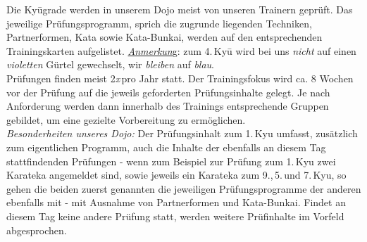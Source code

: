 \begin{center}
{\begin{center}
		\end{center}
		Die Ky\={u}grade werden in unserem Dojo meist von unseren Trainern geprüft. Das jeweilige Prüfungsprogramm, sprich die zugrunde liegenden Techniken, Partnerformen, Kata sowie Kata-Bunkai, werden auf den entsprechenden Trainingskarten aufgelistet. \textit{\underline{Anmerkun}}g: zum 4.\,Ky\={u} wird bei uns \textit{nicht} auf einen \textit{violetten} Gürtel gewechselt, wir \textit{bleiben} auf \textit{blau}.\\

		Prüfungen finden meist 2\textit{x}\,pro Jahr statt. Der Trainingsfokus wird ca. 8 Wochen vor der Prüfung auf die jeweils geforderten Prüfungsinhalte gelegt. Je nach Anforderung werden dann innerhalb des Trainings entsprechende Gruppen gebildet, um eine gezielte Vorbereitung zu ermöglichen.\\

		\textit{Besonderheiten unseres Dojo:} Der Prüfungsinhalt zum 1.\,Kyu umfasst, zusätzlich zum eigentlichen Programm, auch die Inhalte der ebenfalls an diesem Tag stattfindenden Prüfungen - wenn zum Beispiel zur Prüfung zum 1.\,Kyu zwei Karateka angemeldet sind, sowie jeweils ein Karateka zum 9.,\,5.\,und 7.\,Kyu, so gehen die beiden zuerst genannten die jeweiligen Prüfungsprogramme der anderen ebenfalls mit - mit Ausnahme von Partnerformen und Kata-Bunkai. Findet an diesem Tag keine andere Prüfung statt, werden weitere Prüfinhalte im Vorfeld abgesprochen.
	}
	\end{center}\null\vfill\null
	\setlength{\tabcolsep}{6pt}